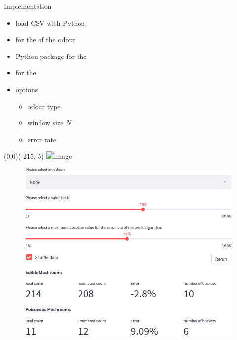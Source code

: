 \begin{frame}{Implementation}
	\begin{itemize}
		\item<2->
		load CSV with Python

		\item<3->
		 for the  of the odour
		
		\item<4->
		Python package  for the 
		
		\item<5->
		 for the 
		
		\item<6->
		options
		\begin{itemize}
			\item<7->
			odour type
			
			\item<8->
			window size $N$
			
			\item<9->
			error rate
		\end{itemize}
	\end{itemize}

	\begin{picture}(0,0)(-215,-5)
		\includegraphics<5->[height=4cm]{images/overview.png}
	\end{picture}
\end{frame}


\begin{frame}{}
	\begin{figure}
		\includegraphics[height=.75\linewidth]{images/typical2.png}
	\end{figure}
\end{frame}

